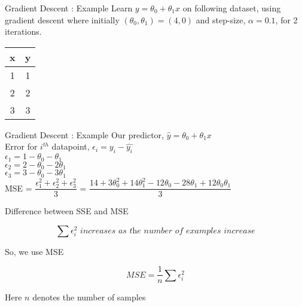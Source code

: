\documentclass[usenames,dvipsnames]{beamer}
\begin{document}
    \begin{frame}{Gradient Descent : Example}
        Learn $y = \theta_0 + \theta_1 x$ on following dataset, using gradient descent where initially $(\theta_0, \theta_1) = (4,0)$ and step-size, $\alpha  = 0.1$, for 2 iterations. 
        \begin{table}[]
            \centering
            \label{tab:my-table}
            \begin{tabular}{|c|c|}
                \hline
                \textbf{x} & \textbf{y} \\ \hline
                1 & 1 \\ \hline
                2 & 2 \\ \hline
                3 & 3 \\ \hline
            \end{tabular}
        \end{table}
        \end{frame}
        
        

    \begin{frame}{Gradient Descent : Example}
        Our predictor, $\hat{y} = \theta_0 + \theta_1x$\\
        \vspace{1cm}
        Error for $i^{th}$ datapoint, $\epsilon_i = y_i - \hat{y_i}$\\
        $\epsilon_1 = 1 - \theta_0 - \theta_1$ \\
        $\epsilon_2 = 2 - \theta_0 - 2\theta_1$ \\
        $\epsilon_3 = 3 - \theta_0 - 3\theta_1$ \\
        
        \vspace{1cm}
        MSE = $\dfrac{\epsilon_1^2 + \epsilon_2^2 + \epsilon_3^2}{3}$ = $\dfrac{14 + 3\theta_0^2 + 14\theta_1^2 -12\theta_0 - 28\theta_1 + 12\theta_0\theta_1}{3}$\\
        \end{frame}
        
            \begin{frame}{Difference between SSE and MSE}
        
        
        
        \begin{equation*}
        \sum \epsilon_{i}^{2} \textit{ increases as the number of examples increase}
        \end{equation*}
        
        So, we use MSE
        
        \begin{equation*}
        \textit{MSE} = \frac{1}{n} \sum \epsilon_{i}^{2}
        \end{equation*}
        
        Here $n$ denotes the number of samples
        
        
        
        \end{frame}
\end{document}
